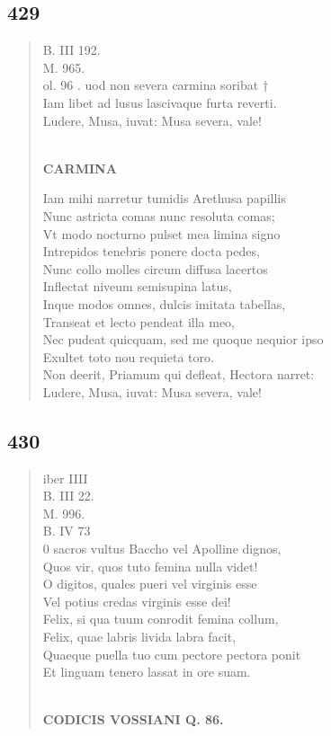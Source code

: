 \documentclass[11pt, a4paper]{report}
\begin{document}
            \subsection*{429}
      \begin{verse}
      B. III 192. \\ M. 965. \\ ol. 96 . uod non severa carmina soribat † \\ Iam libet ad lusus lascivaque furta reverti. \\ Ludere, Musa, iuvat: Musa severa, vale! \\ 
        ﻿\pagebreak 
    \begin{center} \textbf{CARMINA} \end{center} \marginpar{[328]} Iam mihi narretur tumidis Arethusa papillis \\ Nunc astricta comas nunc resoluta comas; \\ Vt modo nocturno pulset mea limina signo \\ Intrepidos tenebris ponere docta pedes, \\ Nunc collo molles circum diffusa lacertos \\ Inflectat niveum semisupina latus, \\ Inque modos omnes, dulcis imitata tabellas, \\ Transeat et lecto pendeat illa meo, \\ Nec pudeat quicquam, sed me quoque nequior ipso \\ Exultet toto nou requieta toro. \\ Non deerit, Priamum qui defleat, Hectora narret: \\ Ludere, Musa, iuvat: Musa severa, vale! \\ 
      \end{verse}
  
            \subsection*{430}
      \begin{verse}
      iber IIII \\ B. III 22. \\ M. 996. \\ B. IV 73 \\ 0 sacros vultus Baccho vel Apolline dignos, \\ Quos vir, quos tuto femina nulla videt! \\ O digitos, quales pueri vel virginis esse \\ Vel potius credas virginis esse dei! \\ Felix, si qua tuum conrodit femina collum, \\ Felix, quae labris livida labra facit, \\ Quaeque puella tuo cum pectore pectora ponit \\ Et linguam tenero lassat in ore suam. \\ 
        ﻿\pagebreak 
    \begin{center} \textbf{CODICIS VOSSIANI Q. 86.} \end{center} \marginpar{[329]} 
      \end{verse}
  
\end{document}
